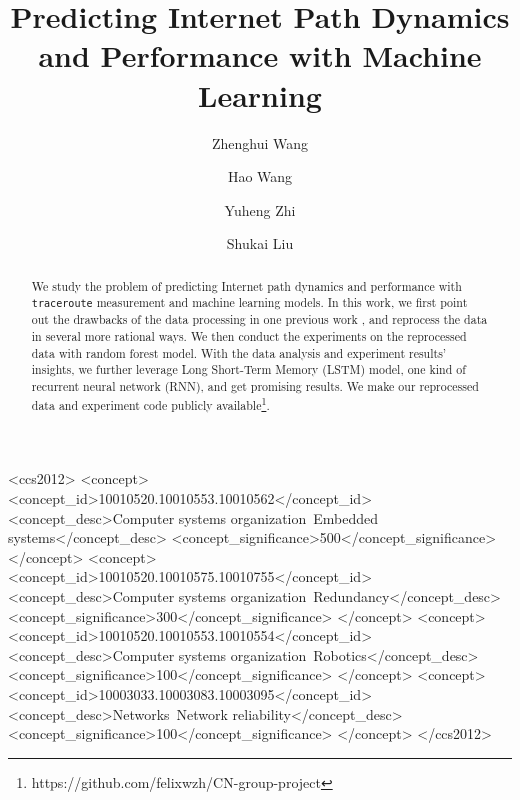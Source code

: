 \documentclass[sigconf]{acmart}
\begin{document}
	\title{Predicting Internet Path Dynamics and Performance with Machine Learning}
	
	
	\author{Zhenghui Wang}
	
	\author{Hao Wang}
	
	\author{Yuheng Zhi}
	
	\author{Shukai Liu}
	
	\renewcommand{\shortauthors}{CN Group}
	
	
	\begin{abstract}
		We study the problem of predicting Internet path dynamics and performance with \texttt{traceroute} measurement and machine learning models. In this work, we first point out the drawbacks of the data processing in one previous work \cite{}, and reprocess the data in several more rational ways. We then conduct the experiments on the reprocessed data with random forest model. With 
		the data analysis and experiment results' insights, we further leverage Long Short-Term Memory (LSTM) model, one kind of recurrent neural network (RNN), and get promising results. We make our reprocessed data and experiment code publicly available\footnote{{https://github.com/felixwzh/CN-group-project}}.
	\end{abstract}
	
	\begin{CCSXML}
		<ccs2012>
		<concept>
		<concept_id>10010520.10010553.10010562</concept_id>
		<concept_desc>Computer systems organization~Embedded systems</concept_desc>
		<concept_significance>500</concept_significance>
		</concept>
		<concept>
		<concept_id>10010520.10010575.10010755</concept_id>
		<concept_desc>Computer systems organization~Redundancy</concept_desc>
		<concept_significance>300</concept_significance>
		</concept>
		<concept>
		<concept_id>10010520.10010553.10010554</concept_id>
		<concept_desc>Computer systems organization~Robotics</concept_desc>
		<concept_significance>100</concept_significance>
		</concept>
		<concept>
		<concept_id>10003033.10003083.10003095</concept_id>
		<concept_desc>Networks~Network reliability</concept_desc>
		<concept_significance>100</concept_significance>
		</concept>
		</ccs2012>  
	\end{CCSXML}
	
\end{document}
